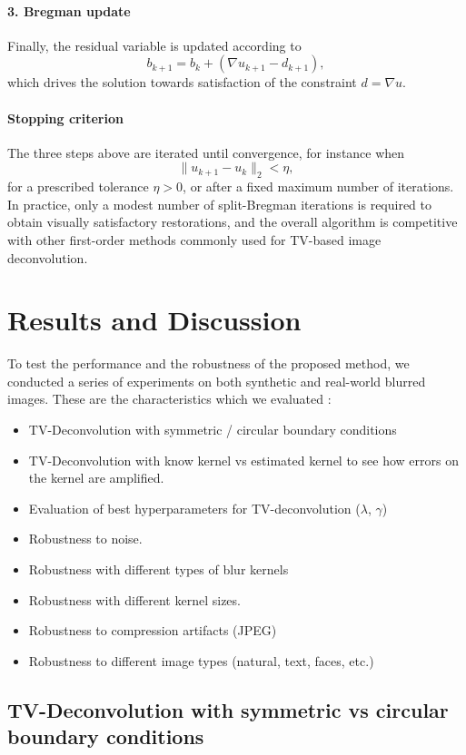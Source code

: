 \documentclass[a4paper,11pt]{article}
\begin{document}
\paragraph{3. Bregman update}
Finally, the residual variable is updated according to
\[
b_{k+1}
=
b_k + (\nabla u_{k+1} - d_{k+1}),
\]
which drives the solution towards satisfaction of the constraint $d = \nabla u$.

\paragraph{Stopping criterion}
The three steps above are iterated until convergence, for instance when
\[
\|u_{k+1} - u_k\|_2 < \eta,
\]
for a prescribed tolerance $\eta>0$, or after a fixed maximum number of
iterations. In practice, only a modest number of split-Bregman iterations is
required to obtain visually satisfactory restorations, and the overall
algorithm is competitive with other first-order methods commonly used for
TV-based image deconvolution.



\section{Results and Discussion}
To test the performance and the robustness of the proposed method, we conducted a series of experiments on both synthetic and real-world blurred images. These are the characteristics which we evaluated : 
\begin{itemize}
    \item TV-Deconvolution with symmetric / circular boundary conditions
    \item TV-Deconvolution with know kernel vs estimated kernel to see how errors on the kernel are amplified.
    \item Evaluation of best hyperparameters for TV-deconvolution ($\lambda$, $\gamma$)
    \item Robustness to noise.
    \item Robustness with different types of blur kernels 
    \item Robustness with different kernel sizes.
    \item Robustness to compression artifacts (JPEG)
    \item Robustness to different image types (natural, text, faces, etc.)
\end{itemize}


\subsection{TV-Deconvolution with symmetric vs circular boundary conditions}
\end{document}
